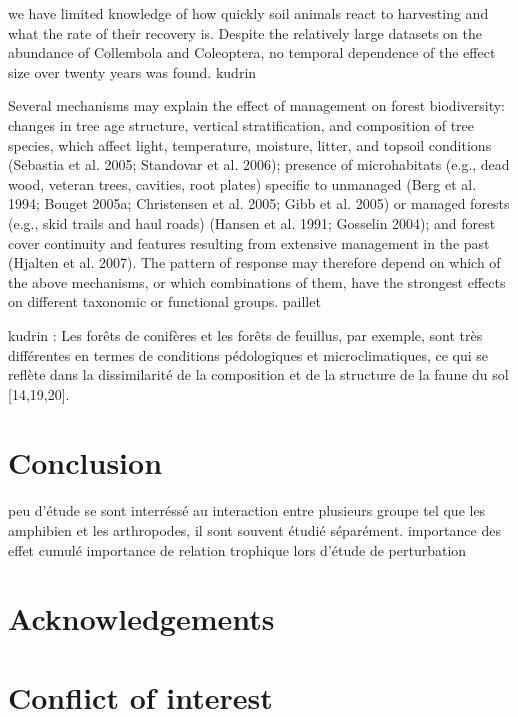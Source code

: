   we have limited knowledge of how quickly soil animals react to harvesting and what the rate of their recovery is.
  Despite the relatively large datasets on the abundance of Collembola and Coleoptera, no temporal dependence of the effect size over twenty years was found. kudrin


  Several mechanisms may explain the effect of management on forest biodiversity: changes in tree age structure, vertical stratification, and composition of tree species, which affect light, temperature, moisture, litter, and topsoil conditions (Sebastia et al. 2005; Standovar et al. 2006); presence of microhabitats (e.g., dead wood, veteran trees, cavities, root plates) specific to unmanaged (Berg et al. 1994; Bouget 2005a; Christensen et al. 2005; Gibb et al. 2005) or managed forests (e.g., skid trails and haul roads) (Hansen et al. 1991; Gosselin 2004); and forest cover continuity and features resulting from extensive management in the past (Hjalten et al. 2007). The pattern of response may therefore depend on which of the above mechanisms, or which combinations of them, have the strongest effects on different taxonomic or functional groups. paillet 

  kudrin :
Les forêts de conifères et les forêts de feuillus, par exemple, sont très différentes en termes de conditions pédologiques et microclimatiques, ce qui se reflète dans la dissimilarité de la composition et de la structure de la faune du sol [14,19,20].


\section*{Conclusion}
\label{sec:conclu1}

peu d'étude se sont interréssé au interaction entre plusieurs groupe tel que les amphibien et les arthropodes, il sont souvent étudié séparément.
importance des effet cumulé
importance de relation trophique lors d'étude de perturbation

\section*{Acknowledgements}
\label{sec:acknowl1}

\section*{Conflict of interest}
\label{sec:conflict1}

